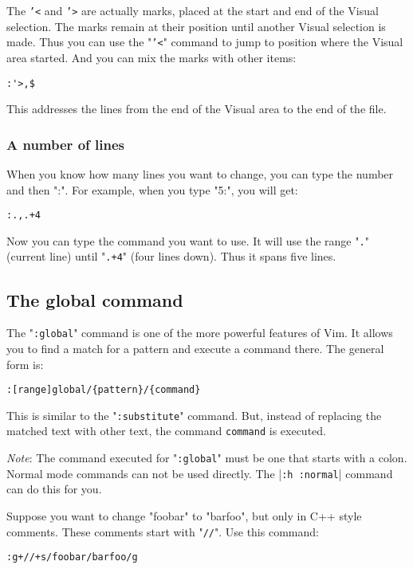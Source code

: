 {The \texttt{'<} and \texttt{'>} are actually marks, placed at the start and end of the Visual selection.
The marks remain at their position until another Visual selection is made.
Thus you can use the "\texttt{'<}" command to jump to position where the Visual area started.
And you can mix the marks with other items:

\begin{Verbatim}[samepage=true]
 :'>,$
\end{Verbatim}

This addresses the lines from the end of the Visual area to the end of the file.
\subsubsection{A number of lines}
When you know how many lines you want to change, you can type the number and then ":".
For example, when you type "5:", you will get:

\begin{Verbatim}[samepage=true]
 :.,.+4
\end{Verbatim}

Now you can type the command you want to use.
It will use the range "\texttt{.}" (current line) until "\texttt{.+4}" (four lines down).
Thus it spans five lines.

\subsection{The global command}
The "\texttt{:global}" command is one of the more powerful features of Vim.
It allows you to find a match for a pattern and execute a command there.
The general form is:

\begin{Verbatim}[samepage=true]
 :[range]global/{pattern}/{command}
\end{Verbatim}

This is similar to the "\texttt{:substitute}" command.
But, instead of replacing the matched text with other text, the command \texttt{{command}} is executed.

\emph{Note}:
The command executed for "\texttt{:global}" must be one that starts with a colon.
Normal mode commands can not be used directly.
The |\texttt{:h :normal}| command can do this for you.

Suppose you want to change "foobar" to "barfoo", but only in C++ style comments.
These comments start with "\texttt{//}".
Use this command:

\begin{Verbatim}[samepage=true]
 :g+//+s/foobar/barfoo/g
\end{Verbatim}

}
